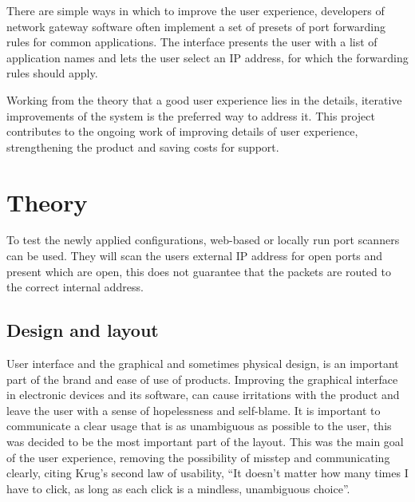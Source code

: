 \documentclass[g5paper,11pt]{kth-bcs}
\begin{document}
There are simple ways in which to improve the user experience, developers of network gateway software often implement a set of presets of port forwarding rules for common applications.
The interface presents the user with a list of application names and lets the user select an IP address, for which the forwarding rules should apply.

Working from the theory that a good user experience lies in the details, iterative improvements of the system is the preferred way to address it.
This project contributes to the ongoing work of improving details of user experience, strengthening the product and saving costs for support.

\chapter{Theory}

To test the newly applied configurations, web-based or locally run port scanners can be used.
They will scan the users external IP address for open ports and present which are open, this does not guarantee that the packets are routed to the correct internal address.

\section{Design and layout}
User interface and the graphical and sometimes physical design, is an important part of the brand and ease of use of products.
Improving the graphical interface in electronic devices and its software, can cause irritations with the product and leave the user with a sense of hopelessness and self-blame.\cite[p.~34]{norman2002design}
It is important to communicate a clear usage that is as unambiguous as possible to the user, this was decided to be the most important part of the layout.
This was the main goal of the user experience, removing the possibility of misstep and communicating clearly, citing Krug's second law of usability\cite[p.~41]{krug2006don}, ``It doesn’t matter how many times I have to click, as long as each click is a mindless, unambiguous choice''.
\end{document}
